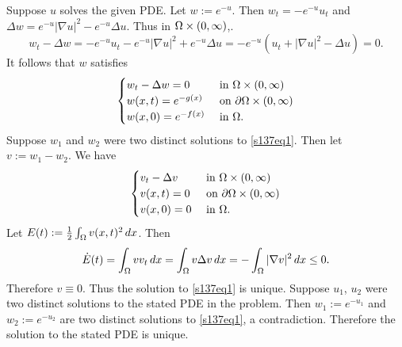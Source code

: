 Suppose $u$ solves the given PDE. Let $w := e^{-u}$. Then $w_{t} = -e^{-u}u_{t}$ and $\Delta w = e^{-u}|\nabla u|^{2} - e^{-u}\Delta u$.
Thus in $\Omega \times (0, \infty)$,.
$$w_{t} - \Delta w = -e^{-u}u_{t} - e^{-u}|\nabla u|^{2} + e^{-u}\Delta u = -e^{-u}(u_{t} + |\nabla u|^{2} - \Delta u) = 0.$$
It follows that $w$ satisfies
\begin{align}\label{s137eq1}
\begin{cases}
w_{t} - \Delta w = 0 & \text{ in } \Omega \times (0, \infty)\\
w(x, t) = e^{-g(x)} & \text{ on } \partial\Omega \times (0, \infty)\\
w(x, 0) = e^{-f(x)} & \text{ in } \Omega.
\end{cases}
\end{align}
Suppose $w_{1}$ and $w_{2}$ were two distinct solutions to \eqref{s137eq1}. Then let $v := w_{1} - w_{2}$. We have
\begin{align*}
\begin{cases}
v_{t} - \Delta v & \text{ in } \Omega \times (0, \infty)\\
v(x, t) = 0 & \text{ on } \partial\Omega \times (0, \infty)\\
v(x, 0) = 0 & \text{ in } \Omega.
\end{cases}
\end{align*}
Let $E(t) := \frac{1}{2}\int_{\Omega}v(x, t)^{2}\, dx$. Then
$$\dot{E}(t) = \int_{\Omega}vv_{t}\, dx = \int_{\Omega}v\Delta v\, dx = -\int_{\Omega}|\nabla v|^{2}\,dx \leq 0.$$
Therefore $v \equiv 0$. Thus the solution to \eqref{s137eq1} is unique. Suppose $u_{1}$, $u_{2}$ were two distinct
solutions to the stated PDE in the problem. Then $w_{1} := e^{-u_{1}}$ and $w_{2} := e^{-u_{2}}$ are two distinct
solutions to \eqref{s137eq1}, a contradiction. Therefore the solution to the stated PDE is unique.


